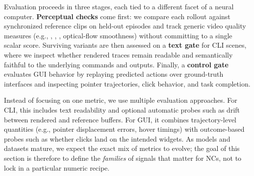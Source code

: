 Evaluation proceeds in three stages, each tied to a different facet of a neural computer. \textbf{Perceptual checks} come first: we compare each rollout against synchronized reference clips on held-out episodes and track generic video quality measures (e.g., \FVD, \LPIPS, \SSIM, optical-flow smoothness) without committing to a single scalar score. Surviving variants are then assessed on a \textbf{text gate} for CLI scenes, where we inspect whether rendered traces remain readable and semantically faithful to the underlying commands and outputs. Finally, a \textbf{control gate} evaluates GUI behavior by replaying predicted actions over ground-truth interfaces and inspecting pointer trajectories, click behavior, and task completion.

Instead of focusing on one metric, we use multiple evaluation approaches. For CLI, this includes text readability and optional automatic probes such as drift between rendered and reference buffers. For GUI, it combines trajectory-level quantities (e.g., pointer displacement errors, hover timings) with outcome-based probes such as whether clicks land on the intended widgets. As models and datasets mature, we expect the exact mix of metrics to evolve; the goal of this section is therefore to define the \emph{families} of signals that matter for NCs, not to lock in a particular numeric recipe.
